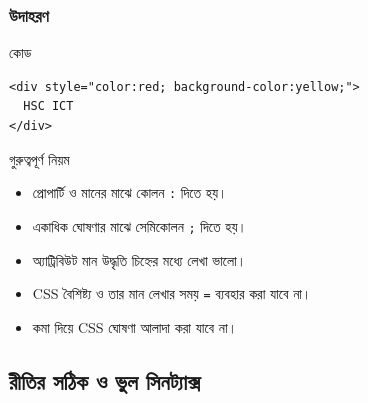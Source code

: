 \subsubsection{উদাহরণ}

\begin{examplebox}{কোড}
\par\noindent\begin{minipage}{\linewidth}
\begin{verbatim}
<div style="color:red; background-color:yellow;">
  HSC ICT
</div>
\end{verbatim}
\end{minipage}\par
\end{examplebox}

\begin{boardbox}{গুরুত্বপূর্ণ নিয়ম}
\begin{itemize}
\item প্রোপার্টি ও মানের মাঝে কোলন \texttt{:} দিতে হয়।
\item একাধিক ঘোষণার মাঝে সেমিকোলন \texttt{;} দিতে হয়।
\item অ্যাট্রিবিউট মান উদ্ধৃতি চিহ্নের মধ্যে লেখা ভালো।
\item CSS বৈশিষ্ট্য ও তার মান লেখার সময় \texttt{=} ব্যবহার করা যাবে না।
\item কমা দিয়ে CSS ঘোষণা আলাদা করা যাবে না।
\end{itemize}
\end{boardbox}

\subsection{রীতির সঠিক ও ভুল সিনট্যাক্স}

